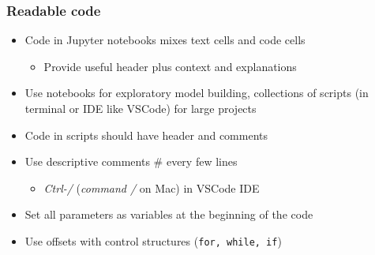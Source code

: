 \documentclass[bigger]{beamer}
\begin{document}
\begin{frame}

\frametitle{Readable code}

\begin{itemize}

\item Code in Jupyter notebooks mixes text cells and code cells
\begin{itemize}
\item Provide useful header plus context and explanations
\end{itemize}

\item Use notebooks for exploratory model building, collections of scripts (in terminal or IDE like VSCode) for large projects 

\item Code in scripts should have header and comments 

\item Use descriptive comments $\#$ every few lines

\begin{itemize}
\item \emph{Ctrl-/} (\emph{command /} on Mac) in VSCode IDE
\end{itemize}

\item Set all parameters as variables at the beginning of the code

\item Use offsets with control structures (\texttt{for, while, if})

\end{itemize}

\end{frame}%
\end{document}
